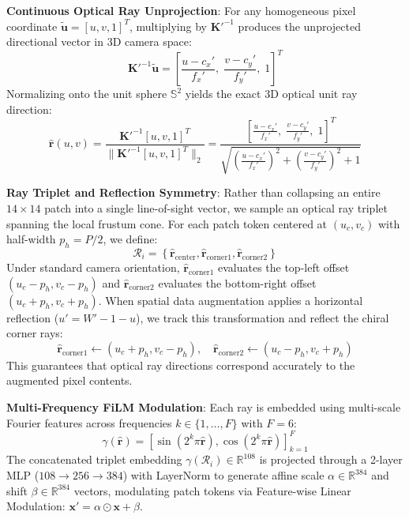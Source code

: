 \noindent\textbf{Continuous Optical Ray Unprojection}: For any homogeneous pixel coordinate $\tilde{\mathbf{u}} = [u, v, 1]^T$, multiplying by $\mathbf{K}'^{-1}$ produces the unprojected directional vector in 3D camera space:
\begin{equation}
    \mathbf{K}'^{-1} \tilde{\mathbf{u}} = \left[ \frac{u - c_x'}{f_x'}, \; \frac{v - c_y'}{f_y'}, \; 1 \right]^T
\end{equation}
Normalizing onto the unit sphere $\mathbb{S}^2$ yields the exact 3D optical unit ray direction:
\begin{equation}
    \hat{\mathbf{r}}(u, v) = \frac{\mathbf{K}'^{-1} [u, v, 1]^T}{\|\mathbf{K}'^{-1} [u, v, 1]^T\|_2} = \frac{\left[ \frac{u - c_x'}{f_x'}, \; \frac{v - c_y'}{f_y'}, \; 1 \right]^T}{\sqrt{\left(\frac{u - c_x'}{f_x'}\right)^2 + \left(\frac{v - c_y'}{f_y'}\right)^2 + 1}}
    \label{eq:ray_unproject}
\end{equation}

\noindent\textbf{Ray Triplet and Reflection Symmetry}: Rather than collapsing an entire $14 \times 14$ patch into a single line-of-sight vector, we sample an optical ray triplet spanning the local frustum cone. For each patch token centered at $(u_c, v_c)$ with half-width $p_h = P / 2$, we define:
\begin{equation}
    \mathcal{R}_i = \left\{ \hat{\mathbf{r}}_{\text{center}}, \hat{\mathbf{r}}_{\text{corner1}}, \hat{\mathbf{r}}_{\text{corner2}} \right\}
\end{equation}
Under standard camera orientation, $\hat{\mathbf{r}}_{\text{corner1}}$ evaluates the top-left offset $(u_c - p_h, v_c - p_h)$ and $\hat{\mathbf{r}}_{\text{corner2}}$ evaluates the bottom-right offset $(u_c + p_h, v_c + p_h)$. When spatial data augmentation applies a horizontal reflection ($u' = W' - 1 - u$), we track this transformation and reflect the chiral corner rays:
\begin{equation}
    \hat{\mathbf{r}}_{\text{corner1}} \leftarrow (u_c + p_h, v_c - p_h), \quad \hat{\mathbf{r}}_{\text{corner2}} \leftarrow (u_c - p_h, v_c + p_h)
\end{equation}
This guarantees that optical ray directions correspond accurately to the augmented pixel contents.

\noindent\textbf{Multi-Frequency FiLM Modulation}: Each ray is embedded using multi-scale Fourier features across frequencies $k \in \{1, \dots, F\}$ with $F=6$:
\begin{equation}
    \gamma(\hat{\mathbf{r}}) = \left[ \sin(2^k \pi \hat{\mathbf{r}}), \cos(2^k \pi \hat{\mathbf{r}}) \right]_{k=1}^{F}
\end{equation}
The concatenated triplet embedding $\gamma(\mathcal{R}_i) \in \mathbb{R}^{108}$ is projected through a 2-layer MLP ($108 \rightarrow 256 \rightarrow 384$) with LayerNorm to generate affine scale $\alpha \in \mathbb{R}^{384}$ and shift $\beta \in \mathbb{R}^{384}$ vectors, modulating patch tokens via Feature-wise Linear Modulation: $\mathbf{x}' = \alpha \odot \mathbf{x} + \beta$.

